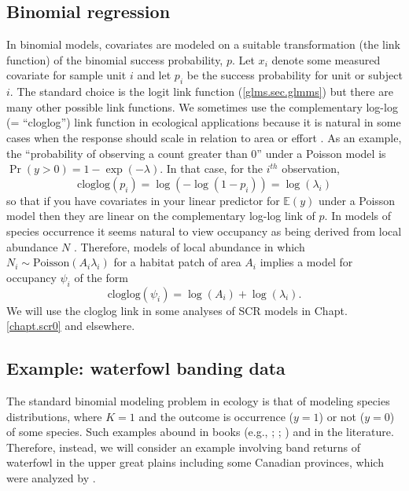 \subsection{Binomial regression}

In binomial models, covariates are modeled on a suitable
transformation (the link function) of the binomial success
probability, $p$.  Let $x_{i}$ denote some measured covariate for
sample unit $i$ and let $p_{i}$ be the success probability for unit or
subject $i$.
The standard choice is the logit link function (\ref{glms.sec.glmms})
but there are many other possible link functions. 
We sometimes use the
complementary log-log (= ``cloglog'') link function in ecological
applications because it is natural in some cases when the response
should scale in relation to area or effort
\citep[][p. 150]{royle_dorazio:2008}. As an example, the
``probability of observing a count greater than 0'' under a Poisson
model is $\Pr(y>0) = 1-\exp(- \lambda)$. In that case, for the
$i^{th}$ observation,
\[
\mbox{cloglog}(p_{i}) = \log(- \log(1-p_{i})) = \log(\lambda_{i})
\]
so that if you have covariates in your linear predictor for $\mathbb{E}(y)$
under a Poisson model then they are linear on the complementary
log-log link of $p$.
In models of species occurrence it seems natural to view occupancy as
being derived from local abundance $N$
\citep{royle_nichols:2003,royle_dorazio:2006,dorazio:2007}.
Therefore,
models of local abundance in which $N_{i} \sim \mbox{Poisson}(A_{i} \lambda_{i})$
for a habitat patch of area $A_{i}$ implies a model for occupancy $\psi_{i}$
of the form
\[
 \mbox{cloglog}(\psi_{i}) = \log(A_{i}) + \log(\lambda_{i}).
\]
We will use the cloglog link in some analyses of
SCR models in Chapt. \ref{chapt.scr0} and elsewhere.


\subsection{ Example: waterfowl banding data}

The standard binomial modeling problem in ecology is that of 
modeling species distributions, 
 where $K=1$ and the outcome is occurrence ($y=1$) or not
($y=0$) of some species. Such examples abound in books (e.g.,
\citet[][ch. 3]{royle_dorazio:2008}; \citet[][ch. 21]{kery:2010};
\citet[][ch. 13]{kery_schaub:2011}) and in the literature.
Therefore, instead, we will
consider an example involving band returns of waterfowl in the upper great plains including some Canadian provinces, which were
analyzed by \citet{royle_dubovsky:2001}.

